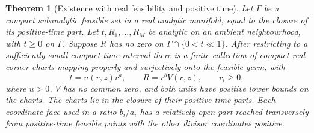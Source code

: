 \documentclass[11pt,reqno]{amsart}
\numberwithin{equation}{section}
\newtheorem{theorem}{Theorem}[section]
\theoremstyle{definition}
\theoremstyle{remark}
\begin{document}
\begin{theorem}[Existence with real feasibility and positive time]\label{thm:presentation}
Let $\Gamma$ be a compact subanalytic feasible set in a real analytic manifold, equal to the closure of its positive-time part. Let $t,R_1,\ldots,R_M$ be analytic on an ambient neighbourhood, with $t\ge0$ on $\Gamma$. Suppose $R$ has no zero on $\Gamma\cap\{0<t\ll1\}$. After restricting to a sufficiently small compact time interval there is a finite collection of compact real corner charts mapping properly and surjectively onto the feasible germ, with
\begin{equation}\label{eq:monomial}
 t=u(r,z)r^a,\qquad R=r^bV(r,z),\qquad r_i\ge0,
\end{equation}
where $u>0$, $V$ has no common zero, and both units have positive lower bounds on the charts. The charts lie in the closure of their positive-time parts. Each coordinate face used in a ratio $b_i/a_i$ has a relatively open part reached transversely from positive-time feasible points with the other divisor coordinates positive.
\end{theorem}
\end{document}
